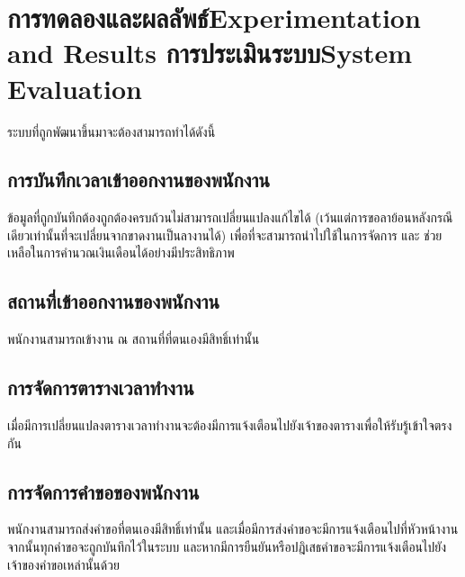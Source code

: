\chapter{\ifproject%
\ifcpe การทดลองและผลลัพธ์\else Experimentation and Results\fi
\else%
\ifcpe การประเมินระบบ\else System Evaluation\fi
\fi}

ระบบที่ถูกพัฒนาขึ้นมาจะต้องสามารถทำได้ดังนี้ 

\section{การบันทึกเวลาเข้าออกงานของพนักงาน} 
ข้อมูลที่ถูกบันทึกต้องถูกต้องครบถ้วนไม่สามารถเปลี่ยนแปลงแก้ไขได้ (เว้นแต่การขอลาย้อนหลังกรณีเดียวเท่านั้นที่จะเปลี่ยนจากขาดงานเป็นลางานได้) เพื่อที่จะสามารถนำไปใช้ในการจัดการ และ ช่วยเหลือในการคำนวณเงินเดือนได้อย่างมีประสิทธิภาพ 

\section{สถานที่เข้าออกงานของพนักงาน}
พนักงานสามารถเข้างาน ณ สถานที่ที่ตนเองมีสิทธิ์เท่านั้น

\section{การจัดการตารางเวลาทำงาน}
เมื่อมีการเปลี่ยนแปลงตารางเวลาทำงานจะต้องมีการแจ้งเตือนไปยังเจ้าของตารางเพื่อให้รับรู้เข้าใจตรงกัน 

\section{การจัดการคำขอของพนักงาน}
พนักงานสามารถส่งคำขอที่ตนเองมีสิทธิ์เท่านั้น และเมื่อมีการส่งคำขอจะมีการแจ้งเตือนไปที่หัวหน้างาน จากนั้นทุกคำขอจะถูกบันทึกไว้ในระบบ และหากมีการยืนยันหรือปฎิเสธคำขอจะมีการแจ้งเตือนไปยังเจ้าของคำขอเหล่านั้นด้วย
